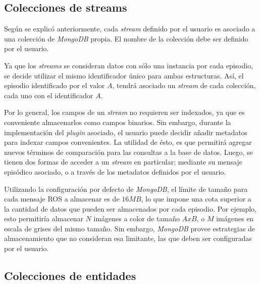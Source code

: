 \subsection{Colecciones de streams}

Según se explicó anteriormente, cada \textit{stream} definido por el usuario es asociado a una colección de \textit{MongoDB} propia. El nombre de la colección debe ser definido por el usuario. 

Ya que los \textit{streams} se consideran datos con sólo una instancia por cada episodio, se decide utilizar el mismo identificador único para ambas estructuras. Así, el episodio identificado por el valor $A$, tendrá asociado un \textit{stream} de cada colección, cada uno con el identificador $A$.


Por lo general, los campos de un \textit{stream} no requieren ser indexados, ya que es conveniente almacenarlos como campos binarios. Sin embargo, durante la implementación del \textit{plugin} asociado, el usuario puede decidir añadir metadatos para indexar campos convenientes. La utilidad de ésto, es que permitirá agregar nuevos términos de comparación para las consultas a la base de datos. Luego, se tienen dos formas de acceder a un \textit{stream} en particular; mediante su mensaje episódico asociado, o a través de los metadatos definidos por el usuario.

Utilizando la configuración por defecto de \textit{MongoDB}, el límite de tamaño para cada mensaje ROS a almacenar es de $16 MB$, lo que impone una cota superior a la cantidad de datos que pueden ser almacenados por cada episodio. Por ejemplo, esto permitiría almacenar $N$ imágenes a color de tamaño $AxB$, o $M$ imágenes en escala de grises del mismo tamaño. Sin embargo, \textit{MongoDB} provee estrategias de almacenamiento que no consideran esa limitante, las que deben ser configuradas por el usuario.



\subsection{Colecciones de entidades}

